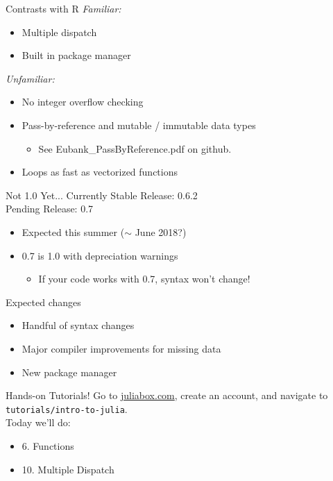 \documentclass[11pt]{beamer}
\begin{document}
\begin{frame}{Contrasts with R}
\emph{Familiar:}
\begin{itemize}
    \itemsep0em
    \item Multiple dispatch
    \item Built in package manager
\end{itemize}
\emph{Unfamiliar:}
\begin{itemize}
    \itemsep0em
    \item No integer overflow checking
    \item Pass-by-reference and mutable / immutable data types
    \begin{itemize}
        \item See Eubank\_PassByReference.pdf on github.
    \end{itemize}
    \item Loops as fast as vectorized functions
\end{itemize}
\end{frame}

\begin{frame}[c]{Not 1.0 Yet...}
Currently Stable Release: 0.6.2 \\
Pending Release: 0.7
\begin{itemize}
    \item Expected this summer ($\sim$ June 2018?)
    \item 0.7 is 1.0 with depreciation warnings
    \begin{itemize}
        \item If your code works with 0.7, syntax won't change!
    \end{itemize}
\end{itemize}
\end{frame}

\begin{frame}[c]{Expected changes}
\begin{itemize}
    \item Handful of syntax changes
    \item Major compiler improvements for missing data
    \item New package manager
\end{itemize}
\end{frame}

\begin{frame}[c]{Hands-on Tutorials!}
    Go to \url{juliabox.com}, create an account, and navigate to \texttt{tutorials/intro-to-julia}.\\
    Today we'll do:
    \begin{itemize}
        \item 6. Functions
        \item 10. Multiple Dispatch
    \end{itemize}
\end{frame}
\end{document}
